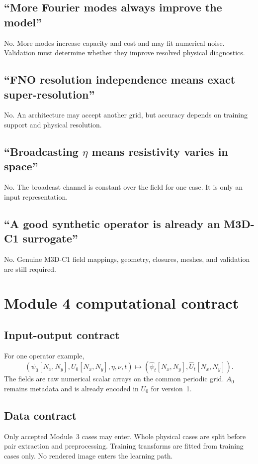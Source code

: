 \documentclass[11pt]{article}
\begin{document}
\subsection{``More Fourier modes always improve the model''}
No. More modes increase capacity and cost and may fit numerical noise. Validation must determine whether they improve resolved physical diagnostics.

\subsection{``FNO resolution independence means exact super-resolution''}
No. An architecture may accept another grid, but accuracy depends on training support and physical resolution.

\subsection{``Broadcasting $\eta$ means resistivity varies in space''}
No. The broadcast channel is constant over the field for one case. It is only an input representation.

\subsection{``A good synthetic operator is already an M3D-C1 surrogate''}
No. Genuine M3D-C1 field mappings, geometry, closures, meshes, and validation are still required.

\section{Module 4 computational contract}
\label{sec:contract}

\subsection{Input-output contract}
For one operator example,
\[
(\psi_0[N_x,N_y],U_0[N_x,N_y],\eta,\nu,t)
\longmapsto
(\widehat\psi_t[N_x,N_y],\widehat U_t[N_x,N_y]).
\]
The fields are raw numerical scalar arrays on the common periodic grid. $A_0$ remains metadata and is already encoded in $U_0$ for version~1.

\subsection{Data contract}
Only accepted Module~3 cases may enter. Whole physical cases are split before pair extraction and preprocessing. Training transforms are fitted from training cases only. No rendered image enters the learning path.
\end{document}
